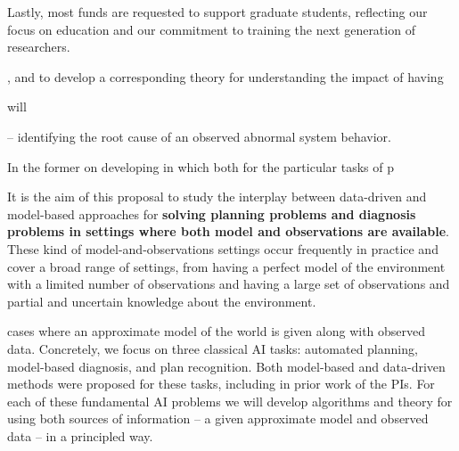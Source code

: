 Lastly, most funds are requested to support graduate students, reflecting our focus on education and our commitment to training the next generation of researchers. 





, and to develop a corresponding theory for understanding the impact of having 


will 


-- identifying the root cause of an observed abnormal system behavior. 



In the former on developing in which both  for the particular tasks of p

It is the aim of this proposal to study the interplay between data-driven and model-based approaches 
for {\bf solving planning problems and diagnosis problems in settings where both model and observations are available}. These kind of model-and-observations settings occur frequently in practice and cover a broad range of settings, from having a perfect model of the environment with a limited  number of observations and having a large set of observations and partial and uncertain knowledge about the environment. 



cases where an approximate model of the world is given along with observed data. Concretely, we focus on three classical AI tasks: automated planning, model-based diagnosis, and plan recognition. Both model-based and data-driven methods were proposed for these tasks, including in prior work of the PIs. 
For each of these fundamental AI problems we will develop algorithms and theory for using both sources of information --  a given approximate model and observed data -- in a principled way. 









